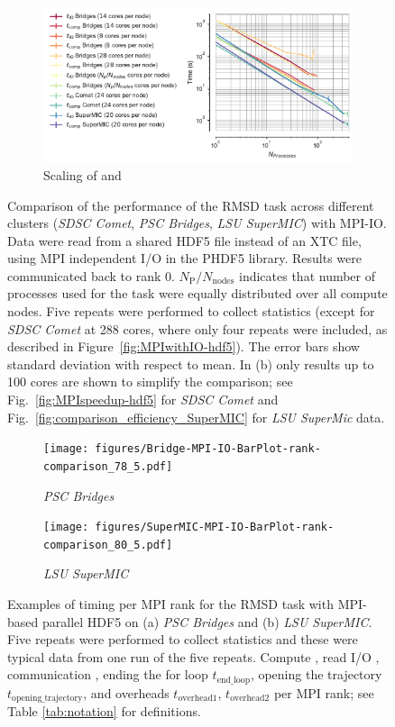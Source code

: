 \begin{figure}[!htb]
  \begin{subfigure} {\textwidth}
    \includegraphics[width=\linewidth]{figures/Clusters_IO_compute_scaling.pdf}
    \captionsetup{format=hang}
    \caption{Scaling of \tcomp and \tIO}
    \label{fig:compute-IO-scaling-clusters}
  \end{subfigure}
  \caption{Comparison of the performance of the RMSD task across different clusters (\emph{SDSC Comet}, \emph{PSC Bridges}, \emph{LSU SuperMIC}) with MPI-IO.
    Data were read from a shared HDF5 file instead of an XTC file, using MPI independent I/O in the PHDF5 library.
    Results were communicated back to rank 0.
    $N_{\text{P}}/N_{\text{nodes}}$ indicates that number of processes used for the task were equally distributed over all compute nodes.
    Five repeats were performed to collect statistics (except for \emph{SDSC Comet} at 288 cores, where only four repeats were included, as described in Figure~\protect\ref{fig:MPIwithIO-hdf5}).
    The error bars show standard deviation with respect to mean.
    In (b) only results up to 100 cores are shown to simplify the comparison; see Fig.~\protect\ref{fig:MPIspeedup-hdf5} for \emph{SDSC Comet} and Fig.~\protect\ref{fig:comparison_efficiency_SuperMIC} for \emph{LSU SuperMic} data.
  }
\label{fig:MPIwithIO-clusters}
\end{figure} 

\begin{figure}[!htb]
  \centering
  \begin{subfigure}{.49\textwidth}
    \texttt{[image: figures/Bridge-MPI-IO-BarPlot-rank-comparison\_78\_5.pdf]}
    \caption{\emph{PSC Bridges}}
    \label{fig:hdf5-bridge}
  \end{subfigure}
  \bigskip
  \begin{subfigure} {.49\textwidth}
    \texttt{[image: figures/SuperMIC-MPI-IO-BarPlot-rank-comparison\_80\_5.pdf]}
    \caption{\emph{LSU SuperMIC}}
    \label{fig:hdf5-SuperMIC}
  \end{subfigure}
  \caption{Examples of timing per MPI rank for the RMSD task with MPI-based parallel HDF5 on (a) \emph{PSC Bridges} and (b) \emph{LSU SuperMIC}.
    Five repeats were performed to collect statistics and these were typical data from one run of the five repeats. Compute \tcomp, read I/O \tIO, communication \tcomm, ending the for loop $t_{\text{end\_loop}}$,  opening the trajectory $t_{\text{opening\_trajectory}}$, and overheads $t_{\text{overhead1}}$, $t_{\text{overhead2}}$ per MPI rank; see Table \ref{tab:notation} for definitions.}
  \label{fig:MPIwithIO-clusters-rank}
\end{figure} 

